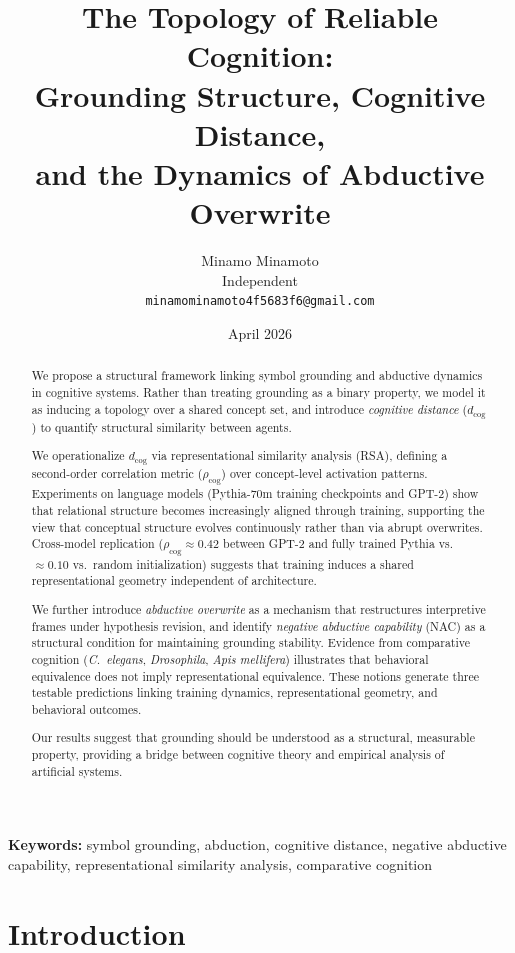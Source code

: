 \documentclass[12pt]{article}
\title{The Topology of Reliable Cognition:\\
Grounding Structure, Cognitive Distance,\\
and the Dynamics of Abductive Overwrite}
\author{Minamo Minamoto\\
Independent\\
\texttt{minamominamoto4f5683f6@gmail.com}}
\date{April 2026}
\begin{document}
\maketitle

\begin{abstract}
We propose a structural framework linking symbol grounding and abductive
dynamics in cognitive systems.
Rather than treating grounding as a binary property, we model it as
inducing a topology over a shared concept set, and introduce
\emph{cognitive distance} ($d_\mathrm{cog}$) to quantify structural
similarity between agents.

We operationalize $d_\mathrm{cog}$ via representational similarity
analysis (RSA), defining a second-order correlation metric
($\rho_\mathrm{cog}$) over concept-level activation patterns.
Experiments on language models (Pythia-70m training checkpoints and
GPT-2) show that relational structure becomes increasingly aligned
through training, supporting the view that conceptual structure
evolves continuously rather than via abrupt overwrites.
Cross-model replication ($\rho_\mathrm{cog} \approx 0.42$ between
GPT-2 and fully trained Pythia vs.\ $\approx 0.10$ vs.\ random
initialization) suggests that training induces a shared representational
geometry independent of architecture.

We further introduce \emph{abductive overwrite} as a mechanism that
restructures interpretive frames under hypothesis revision, and identify
\emph{negative abductive capability} (NAC) as a structural condition
for maintaining grounding stability.
Evidence from comparative cognition (\textit{C.~elegans},
\textit{Drosophila}, \textit{Apis mellifera}) illustrates that
behavioral equivalence does not imply representational equivalence.
These notions generate three testable predictions linking training
dynamics, representational geometry, and behavioral outcomes.

Our results suggest that grounding should be understood as a structural,
measurable property, providing a bridge between cognitive theory and
empirical analysis of artificial systems.
\end{abstract}

\noindent\textbf{Keywords:} symbol grounding, abduction, cognitive distance, negative abductive capability, representational similarity analysis, comparative cognition

\tableofcontents

\section{Introduction}
\end{document}
